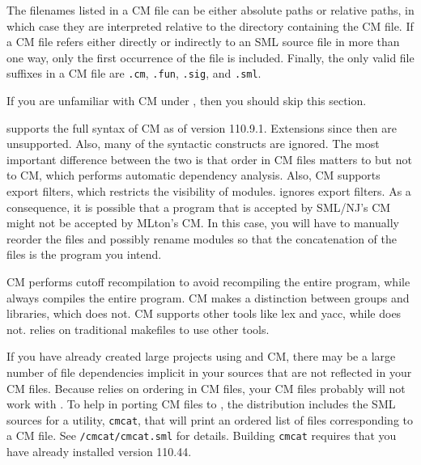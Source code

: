 The filenames listed in a CM file can be either absolute paths or
relative paths, in which case they are interpreted relative to the
directory containing the CM file.  If a CM file refers either directly
or indirectly to an SML source file in more than one way, only the
first occurrence of the file is included.  Finally, the only valid
file suffixes in a CM file are {\tt .cm}, {\tt .fun}, {\tt .sig}, and
{\tt .sml}.
%

If you are unfamiliar with CM under {\smlnj}, then you should skip this
section.

{\mlton} supports the full syntax of CM as of {\smlnj} version
110.9.1.  Extensions since then are unsupported.  Also, many of the
syntactic constructs are ignored.  The most important difference
between the two is that order in CM files matters to {\mlton} but not
to CM, which performs automatic dependency analysis.  Also, CM
supports export filters, which restricts the visibility of modules.
{\mlton} ignores export filters.  As a consequence, it is possible
that a program that is accepted by SML/NJ's CM might not be accepted
by MLton's CM.  In this case, you will have to manually reorder the
files and possibly rename modules so that the concatenation of the
files is the program you intend.

CM performs cutoff recompilation to avoid recompiling the entire
program, while {\mlton} always compiles the entire program.  CM makes
a distinction between groups and libraries, which {\mlton} does not.
CM supports other tools like lex and yacc, while {\mlton} does not.
{\mlton} relies on traditional makefiles to use other tools.
%

If you have already created large projects using {\smlnj} and CM,
there may be a large number of file dependencies implicit in your
sources that are not reflected in your CM files.  Because {\mlton}
relies on ordering in CM files, your CM files probably will not work
with {\mlton}.  To help in porting CM files to {\mlton}, the {\mlton}
distribution includes the SML sources for a utility, {\tt cmcat}, that
will print an ordered list of files corresponding to a CM file.  See
{\tt \doc/cmcat/cmcat.sml} for details.  Building {\tt cmcat} requires
that you have already installed {\smlnj} version 110.44.
